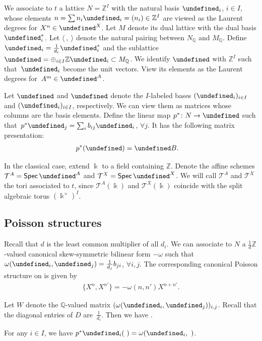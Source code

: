 \documentclass[10pt,a4paper]{amsart}
\newcommand{\kk}{\Bbbk}
\newcommand{\Z}{\mathbb{Z}}
\newcommand{\Q}{\mathbb{Q}}
\newcommand{\Spec}{\operatorname{\mathsf{Spec}}}
\newcommand{\cT}{{\mathcal T}}
\newcommand{\torus}{\cT}%
\let\Mc\undefined
\let\LP\undefined
\let\ee\undefined
\let\ff\undefined
\let\uee\undefined
\let\uff\undefined
\newcommand{\Mc}{M^\circ}
\newcommand{\LP}{{\mathcal{LP}}}
\newcommand{\ee}{\mathbf{e}}
\newcommand{\ff}{\mathbf{f}}
\newcommand{\uee}{\underline{\ee}}
\newcommand{\uff}{\underline{\ff}}
\numberwithin{equation}{section}
\begin{document}
We associate to $t$ a lattice $N=\Z^{I}$ with the natural basis
$\ee_{i}$, $i\in I$, whose elements $n=\sum n_{i}\ee_{i}=(n_{i})\in\Z^{I}$
are viewed as the Laurent degrees for $X^{n}\in\LP^{X}$. Let $M$
denote its dual lattice with the dual basis $\ee_{i}^{*}$. Let $\langle\ ,\ \rangle$
denote the natural pairing between $N_{\Q}$ and $M_{\Q}$. Define
$\ff_{i}=\frac{1}{d_{i}}\ee_{i}^{*}$ and the sublattice $\Mc=\oplus_{i\in I}\Z\ff_{i}\subset M_{\Q}$.
We identify $\Mc$ with $\Z^{I}$ such that~$\ff_{i}$ become the
unit vectors. View its elements \smash{$m=\sum m_{i}\ff_{i}=(m_{i})\in\Z^{I}$}
as the Laurent degrees for~$A^{m}\in\LP^{A}$.

Let $\uee$ and $\uff$ denote the $I$-labeled bases $(\ee_{i})_{i\in I}$
and $(\ff_{i})_{i\in I}$, respectively. We can view them as matrices
whose columns are the basis elements. Define the linear map $p^{*}\colon N\rightarrow\Mc$
such that~$p^{*}\ee_{j}=\sum_{i}b_{ij}\ff_{i}$, $\forall j$. It
has the following matrix presentation:
\begin{align*}
p^{*}(\uee) & =\uff B.
\end{align*}


In the classical case, extend $\kk$ to a field containing $\Z$. Denote the affine schemes $\torus^{A}=\Spec\LP^{A}$ and $\torus^{X}=\Spec\LP^{X}$.
We will call $\torus^{A}$ and $\torus^{X}$ the tori associated to
$t$, since $\torus^{A}(\kk)$ and $\torus^{X}(\kk)$ coincide with
the split algebraic torus $(\kk^{\times})^{I}$.

\subsection{Poisson structures}

Recall that $d$ is the least common multiplier of all $d_i$. We can associate to $N$ a $\frac{1}{d}\Z$-valued canonical skew-symmetric bilinear
form $-\omega$ such that $\omega(\ee_{i},\ee_{j})=\frac{1}{d_{j}}b_{ji}$,
$\forall i,j$. The corresponding canonical Poisson structure on \smash{$\cT^{X}$}
is given by
\begin{align}
\bigl\{X^{n},X^{n'}\bigr\} =-\omega(n,n')X^{n+n'}.\label{eq:log-Poisson}
\end{align}

Let $W$ denote the $\Q$-valued matrix $(\omega(\ee_{i},\ee_{j}))_{i,j}$. Recall that the diagonal entries of $D$ are~$\frac{1}{d_i}$. Then we have .


\begin{Remark}
For any $i\in I$, we have $p^{*}\ee_{i}(\ )=\omega(\ee_{i},\ )$.
\end{Remark}
\end{document}
